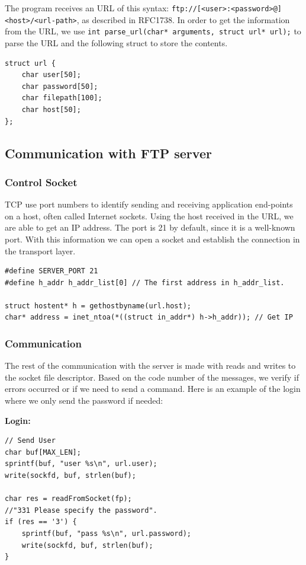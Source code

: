 \documentclass[11pt]{report}
\begin{document}
The program receives an URL of this syntax: \texttt{ftp://[<user>:<password>@]<host>/<url-path>}, as described in RFC1738.
In order to get the information from the URL, we use \texttt{int parse_url(char* arguments, struct url* url);} to parse the URL and the following struct to store the contents.

\begin{verbatim}
struct url {
    char user[50];
    char password[50];
    char filepath[100];
    char host[50];
};
\end{verbatim}

\subsection{Communication with FTP server}
\subsubsection{Control Socket}
TCP use port numbers to identify sending and receiving application end-points on a host, often called Internet sockets. Using the host received in the URL, we are able to get an IP address. The port is 21 by default, since it is a well-known port. With this information we can open a socket and establish the connection in the transport layer.

\begin{verbatim}
#define SERVER_PORT 21
#define h_addr h_addr_list[0] // The first address in h_addr_list.

struct hostent* h = gethostbyname(url.host);
char* address = inet_ntoa(*((struct in_addr*) h->h_addr)); // Get IP
\end{verbatim}

\subsubsection{Communication}

The rest of the communication with the server is made with reads and writes to the socket file descriptor. Based on the code number of the messages, we verify if errors occurred or if we need to send a command. Here is an example of the login where we only send the password if needed: 

\textbf{Login:}
\begin{verbatim}
// Send User
char buf[MAX_LEN];
sprintf(buf, "user %s\n", url.user);
write(sockfd, buf, strlen(buf);

char res = readFromSocket(fp);
//"331 Please specify the password".
if (res == '3') {
    sprintf(buf, "pass %s\n", url.password);
    write(sockfd, buf, strlen(buf);
}
\end{verbatim}
\end{document}
